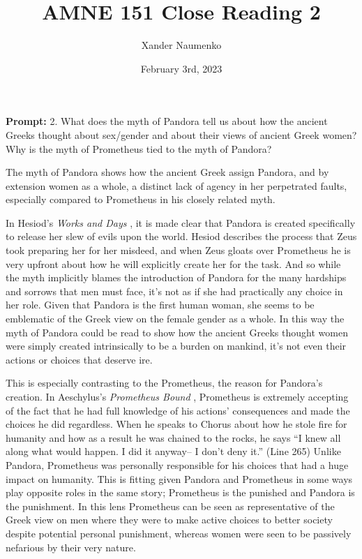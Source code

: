 \documentclass[letterpaper, reqno,11pt]{article}
\begin{document}
\title{AMNE 151 Close Reading 2}
\date{February 3rd, 2023}
\author{Xander Naumenko}
\maketitle

{\bf Prompt:} 2. What does the myth of Pandora tell us about how the ancient Greeks thought about sex/gender and about their views of ancient Greek women? Why is the myth of Prometheus tied to the myth of Pandora?  

\medskip

The myth of Pandora shows how the ancient Greek assign Pandora, and by extension women as a whole, a distinct lack of agency in her perpetrated faults, especially compared to Prometheus in his closely related myth. 

In Hesiod's \emph{Works and Days} \autocite{works}, it is made clear that Pandora is created specifically to release her slew of evils upon the world. Hesiod describes the process that Zeus took preparing her for her misdeed, and when Zeus gloats over Prometheus he is very upfront about how he will explicitly create her for the task. And so while the myth implicitly blames the introduction of Pandora for the many hardships and sorrows that men must face, it's not as if she had practically any choice in her role. Given that Pandora is the first human woman, she seems to be emblematic of the Greek view on the female gender as a whole. In this way the myth of Pandora could be read to show how the ancient Greeks thought women were simply created intrinsically to be a burden on mankind, it's not even their actions or choices that deserve ire. 

This is especially contrasting to the Prometheus, the reason for Pandora's creation. In Aeschylus's \emph{Prometheus Bound} \autocite{bound}, Prometheus is extremely accepting of the fact that he had full knowledge of his actions' consequences and made the choices he did regardless. When he speaks to Chorus about how he stole fire for humanity and how as a result he was chained to the rocks, he says ``I knew all along what would happen. I did it anyway– I don’t deny it.'' (Line 265) Unlike Pandora, Prometheus was personally responsible for his choices that had a huge impact on humanity. This is fitting given Pandora and Prometheus in some ways play opposite roles in the same story; Prometheus is the punished and Pandora is the punishment. In this lens Prometheus can be seen as representative of the Greek view on men where they were to make active choices to better society despite potential personal punishment, whereas women were seen to be passively nefarious by their very nature. 

\printbibliography
\end{document}

